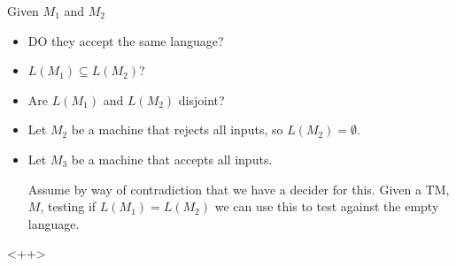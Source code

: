 \documentclass[12pt]{article}
\begin{document}
Given $M_1$ and $M_2$
\begin{itemize}
	\item DO they accept the same language?
	\item $L(M_1) \subseteq L(M_2)$?
	\item Are $L(M_1)$ and $L(M_2)$ disjoint?
	\item Let $M_2$ be a machine that rejects all inputs, so $L(M_2) =
		\emptyset$.
	\item Let $M_3$ be a machine that accepts all inputs.

		Assume by way of contradiction that we have a decider for this. Given a
		TM, $M$, testing if $L(M_1) = L(M_2)$ we can use this to test against
		the empty language.
\end{itemize}<++>
\end{document}

